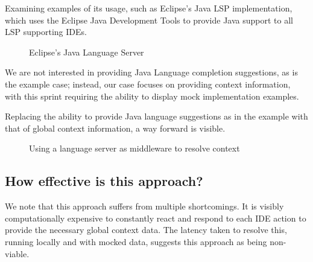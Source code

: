Examining examples of its usage, such as Eclipse's Java LSP implementation, which uses the Eclipse Java Development Tools to provide Java support to all LSP supporting IDEs.

\begin{figure}[h!]
	
	
	\caption{Eclipse's Java Language Server}
	
\end{figure}

We are not interested in providing Java Language completion suggestions, as is the example case; instead, our case focuses on providing context information, with this sprint requiring the ability to display mock implementation examples.

Replacing the ability to provide Java language suggestions as in the example with that of global context information, a way forward is visible.

\begin{figure}[h!]
	
	\caption{Using a language server as middleware to resolve context}
\end{figure}



\subsection{How effective is this approach?}

We note that this approach suffers from multiple shortcomings. It is visibly computationally expensive to constantly react and respond to each IDE action to provide the necessary global context data. The latency taken to resolve this, running locally and with mocked data, suggests this approach as being non-viable. 

